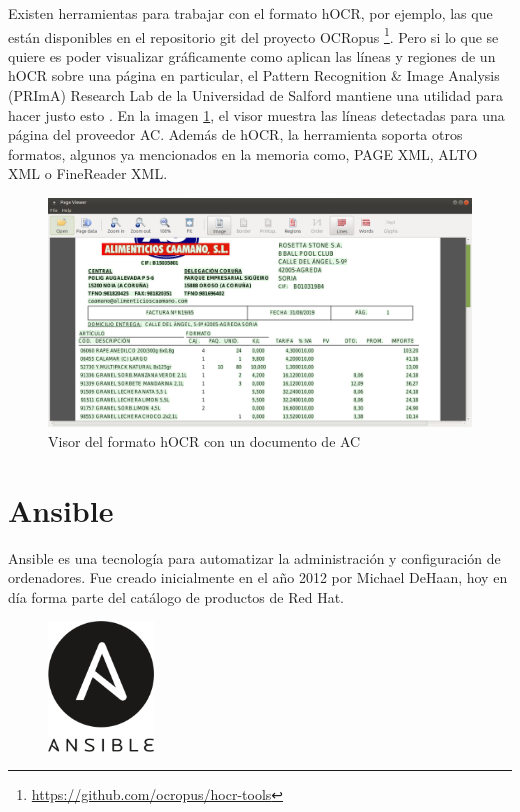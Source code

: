 Existen herramientas para trabajar con el formato hOCR, por ejemplo, las que están disponibles en el repositorio git del proyecto OCRopus \footnote{\url{https://github.com/ocropus/hocr-tools}}. Pero si lo que se quiere es poder visualizar gráficamente como aplican las líneas y regiones de un hOCR sobre una página en particular, el Pattern Recognition \& Image Analysis (PRImA) Research Lab de la Universidad de Salford mantiene una utilidad para hacer justo esto \cite{prima_tool_page_viewer}. En la imagen \ref{fig:visor-formato-hocr}, el visor muestra las líneas detectadas para una página del proveedor AC. Además de hOCR, la herramienta soporta otros formatos, algunos ya mencionados en la memoria como, PAGE XML, ALTO XML o FineReader XML.

\begin{figure}[hp!]
    \centering
    \includegraphics[width=1.0\textwidth]{imaxes/z-adicional/visor-hocr.png}
    \caption{Visor del formato hOCR con un documento de AC}
    \label{fig:visor-formato-hocr}
\end{figure}

\section{Ansible}


Ansible es una tecnología para automatizar la administración y configuración de ordenadores. Fue creado inicialmente en el año 2012 por Michael DeHaan, hoy en día forma parte del catálogo de productos de Red Hat.

\begin{figure}
    \centering
    \includegraphics[width=0.25\textwidth]{imaxes/e-fundamentos-tecnologicos/logo-ansible.png}
\end{figure}

